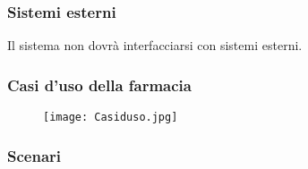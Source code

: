 \subsubsection{Sistemi esterni}
\label{sec:esterno}

Il sistema non dovrà interfacciarsi con sistemi esterni.


\newpage %
\subsubsection{Casi d'uso della farmacia}

\begin{figure}[h!]
  \begin{center}
    \texttt{[image: Casiduso.jpg]}
  \end{center}
\end{figure}

\newpage %
\subsubsection{Scenari}
\hfill \break

